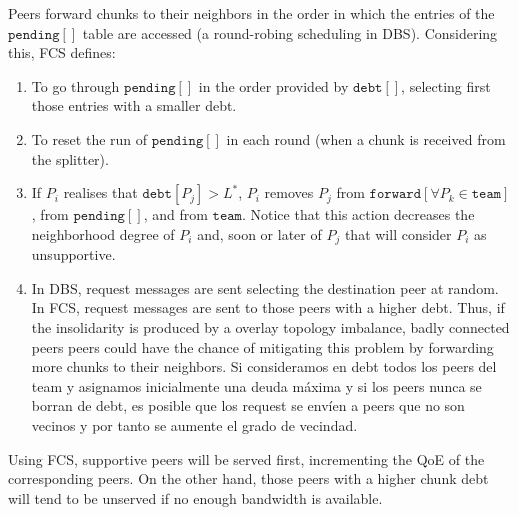 Peers forward chunks to their neighbors in the order in which the
entries of the $\mathtt{pending}[]$ table are accessed (a round-robing
scheduling in DBS). Considering this, FCS defines:
\begin{enumerate}
\item To go through $\mathtt{pending}[]$ in the order provided by
  $\mathtt{debt}[]$, selecting first those entries with a smaller
  debt.
\item To reset the run of $\mathtt{pending}[]$ in each round (when a
  chunk is received from the splitter).
\item If $P_i$ realises that $\mathtt{debt}[P_j]>L^*$, $P_i$ removes
  $P_j$ from $\mathtt{forward}[\forall P_k\in\mathtt{team}]$, from
  $\mathtt{pending}[]$, and from $\mathtt{team}$. Notice that this action
  decreases the neighborhood degree of $P_i$ and, soon or later of
  $P_j$ that will consider $P_i$ as unsupportive.
\item In DBS, request messages are sent selecting the destination peer
  at random. In FCS, request messages are sent to those peers with a
  higher debt. Thus, if the insolidarity is produced by a overlay
  topology imbalance, badly connected peers peers could have the
  chance of mitigating this problem by forwarding more chunks to their
  neighbors. Si consideramos en debt todos los peers del team y asignamos inicialmente una deuda máxima y si los peers nunca se borran de debt, es posible que los request se envíen a peers que no son vecinos y por tanto se aumente el grado de vecindad.
\end{enumerate}

Using FCS, supportive peers will be served first, incrementing the
QoE of the corresponding peers. On the other hand, those peers with a
higher chunk debt will tend to be unserved if no enough bandwidth is
available. 


